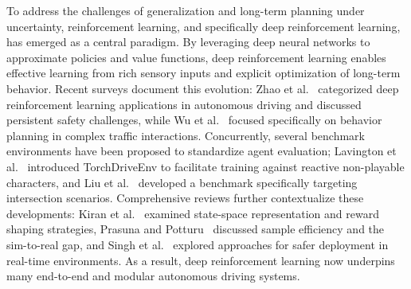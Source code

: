 \documentclass[]{interact}
\begin{document}
To address the challenges of generalization and long-term planning under uncertainty, reinforcement learning, and specifically deep reinforcement learning, has emerged as a central paradigm. By leveraging deep neural networks to approximate policies and value functions, deep reinforcement learning enables effective learning from rich sensory inputs and explicit optimization of long-term behavior. Recent surveys document this evolution: Zhao et al.~\cite{zhao2024survey} categorized deep reinforcement learning applications in autonomous driving and discussed persistent safety challenges, while Wu et al.~\cite{wu2024survey} focused specifically on behavior planning in complex traffic interactions. Concurrently, several benchmark environments have been proposed to standardize agent evaluation; Lavington et al.~\cite{lavington2024torchdriveenv} introduced TorchDriveEnv to facilitate training against reactive non-playable characters, and Liu et al.~\cite{liu2021rlbenchmark} developed a benchmark specifically targeting intersection scenarios. Comprehensive reviews further contextualize these developments: Kiran et al.~\cite{kiran2021rl} examined state-space representation and reward shaping strategies, Prasuna and Potturu~\cite{prasuna2024deep} discussed sample efficiency and the sim-to-real gap, and Singh et al.~\cite{singh2025improvised} explored approaches for safer deployment in real-time environments. As a result, deep reinforcement learning now underpins many end-to-end and modular autonomous driving systems.
\end{document}
